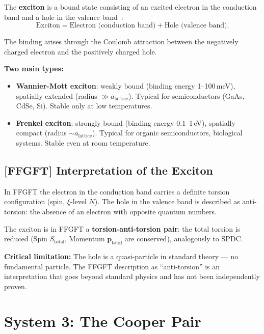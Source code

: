 The \textbf{exciton} is a bound state consisting of an
excited electron in the conduction band and a hole
in the valence band~\cite{Wannier1937,Frenkel1931}:
\begin{equation}
  \text{Exciton} = \text{Electron (conduction band)} + \text{Hole (valence band)}.
\end{equation}

The binding arises through the Coulomb attraction between the
negatively charged electron and the positively charged hole.

\textbf{Two main types:}
\begin{itemize}
  \item \textbf{Wannier-Mott exciton}: weakly bound
    (binding energy 1--100\,meV), spatially extended
    (radius $\gg a_\text{lattice}$). Typical for semiconductors
    (GaAs, CdSe, Si). Stable only at low temperatures.
  \item \textbf{Frenkel exciton}: strongly bound
    (binding energy 0.1--1\,eV), spatially compact
    (radius $\sim a_\text{lattice}$). Typical for organic
    semiconductors, biological systems. Stable even at room temperature.
\end{itemize}

\subsection{[FFGFT] Interpretation of the Exciton}

\begin{foundation}
In FFGFT the electron in the conduction band carries
a definite torsion configuration (spin, $\xi$-level $N$).
The hole in the valence band is described as
anti-torsion: the absence of an electron with
opposite quantum numbers.

The exciton is in FFGFT a \textbf{torsion-anti-torsion pair}:
the total torsion is reduced (Spin $S_\text{total}$,
Momentum $\mathbf{p}_\text{total}$ are conserved),
analogously to SPDC.

\textbf{Critical limitation:}
The hole is a quasi-particle in standard theory ---
no fundamental particle. The FFGFT description as
``anti-torsion'' is an interpretation that goes beyond
standard physics and has not been independently proven.
\end{foundation}

\section{System 3: The Cooper Pair}
\label{sec:cooper-pair}

